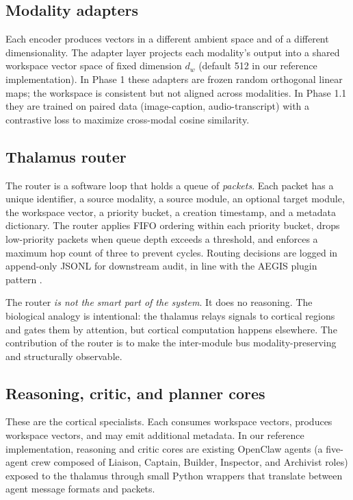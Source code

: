 \documentclass[11pt]{article}
\begin{document}
\subsection{Modality adapters}
Each encoder produces vectors in a different ambient space and
of a different dimensionality. The adapter layer projects each
modality's output into a shared workspace vector space of fixed
dimension $d_w$ (default 512 in our reference implementation).
In Phase 1 these adapters are frozen random orthogonal linear
maps; the workspace is consistent but not aligned across
modalities. In Phase 1.1 they are trained on paired data
(image-caption, audio-transcript) with a contrastive loss to
maximize cross-modal cosine similarity.

\subsection{Thalamus router}
The router is a software loop that holds a queue of \emph{packets}.
Each packet has a unique identifier, a source modality, a source
module, an optional target module, the workspace vector, a
priority bucket, a creation timestamp, and a metadata dictionary.
The router applies FIFO ordering within each priority bucket,
drops low-priority packets when queue depth exceeds a threshold,
and enforces a maximum hop count of three to prevent cycles.
Routing decisions are logged in append-only JSONL for downstream
audit, in line with the AEGIS plugin pattern \cite{aegis}.

The router \emph{is not the smart part of the system}. It does
no reasoning. The biological analogy is intentional: the
thalamus relays signals to cortical regions and gates them by
attention, but cortical computation happens elsewhere. The
contribution of the router is to make the inter-module bus
modality-preserving and structurally observable.

\subsection{Reasoning, critic, and planner cores}
These are the cortical specialists. Each consumes workspace
vectors, produces workspace vectors, and may emit additional
metadata. In our reference implementation, reasoning and critic
cores are existing OpenClaw agents (a five-agent crew composed
of Liaison, Captain, Builder, Inspector, and Archivist roles)
exposed to the thalamus through small Python wrappers that
translate between agent message formats and packets.
\end{document}
